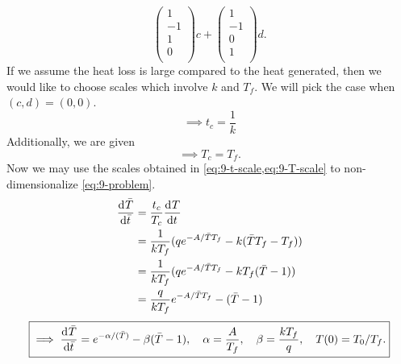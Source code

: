 \documentclass[12pt]{article}
\begin{document}
\begin{enumerate}
\begin{equation*}
\begin{pmatrix}
      1 \\ -1 \\ 1 \\ 0 \\
    \end{pmatrix}c +
    \begin{pmatrix}
      1 \\ -1 \\ 0 \\ 1 \\
    \end{pmatrix}d.
  \end{equation*}
  If we assume the heat loss is large compared to the heat generated, then we
  would like to choose scales which involve $k$ and $T_f$. We will pick the case
  when $(c,d)=(0,0)$.
  \begin{equation}
    \label{eq:9-t-scale}
    \implies t_c  = \frac{1}{k}
  \end{equation}
  Additionally, we are given
  \begin{equation}
    \label{eq:9-T-scale}
    \implies T_c  = T_f.
  \end{equation}
  Now we may use the scales obtained in \cref{eq:9-t-scale,eq:9-T-scale} to
  non-dimensionalize \cref{eq:9-problem}.
  \begin{equation*}
    \begin{aligned}
      \frac{\mathrm{d}^{} {\bar{T}}}{\mathrm{d}{\bar{t}}^{}} &= \frac{t_c}{T_c}\frac{\mathrm{d}^{} {T}}{\mathrm{d}{t}^{}} \\
      &= \frac{1}{kT_f}(qe^{-A/\bar{T}T_f} - k(\bar{T}T_f-T_f)) \\
      &= \frac{1}{kT_f}(qe^{-A/\bar{T}T_f} - kT_f(\bar{T}-1)) \\
      &= \frac{q}{kT_f}e^{-A/\bar{T}T_f} - (\bar{T}-1)
    \end{aligned}
  \end{equation*}
  \begin{equation*} \boxed{
      \implies \frac{\mathrm{d}^{} {\bar{T}}}{\mathrm{d}{\bar{t}}^{}} =
      e^{-\alpha/(\bar{T})}-\beta(\bar{T}-1), \quad \alpha = \frac{A}{T_f},
      \quad \beta = \frac{kT_f}{q}, \quad T(0) = T_0/T_f.
    }
  \end{equation*}
\end{enumerate}

\skiptooddpage{}
\end{document}
